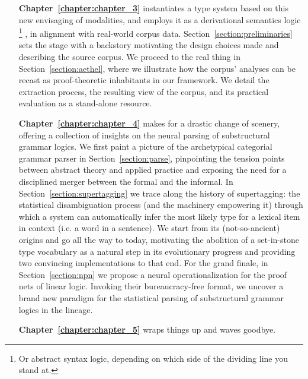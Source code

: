{\begin{enumerate}[labelindent=2pt, itemindent=30pt, labelsep=5pt, widest=Chapter III,align=right,itemsep=5pt]
Unsatisfied by the comparison, we move on to Section~\ref{section:modalities_for_dependency}, where we appropriate the modalities we resorted to earlier, repurposing them now as dependency domain demarcators.
\item[\textbf{Chapter~\ref{chapter:chapter_3}}] instantiates a type system based on this new envisaging of modalities, and employs it as a derivational semantics logic%
	\footnote{Or abstract syntax logic, depending on which side of the dividing line you stand at.}%
, in alignment with real-world corpus data. 
Section~\ref{section:preliminaries} sets the stage with a backstory motivating the design choices made and describing the source corpus.
We proceed to the real thing in Section~\ref{section:aethel}, where we illustrate how the corpus' analyses can be recast as proof-theoretic inhabitants in our framework.
We detail the extraction process, the resulting view of the corpus, and its practical evaluation as a stand-alone resource.
\item[\textbf{Chapter~\ref{chapter:chapter_4}}] makes for a drastic change of scenery, offering a collection of insights on the neural parsing of substructural grammar logics.
We first paint a picture of the archetypical categorial grammar parser in Section~\ref{section:parse}, pinpointing the tension points between abstract theory and applied practice and exposing the need for a disciplined merger between the formal and the informal.
In Section~\ref{section:supertagging} we trace along the history of supertagging: the statistical disambiguation process (and the machinery empowering it) through which a system can automatically infer the most likely type for a lexical item in context (i.e. a word in a sentence).
We start from its (not-so-ancient) origins and go all the way to today, motivating the abolition of a set-in-stone type vocabulary as a natural step in its evolutionary progress and providing two convincing implementations to that end.
For the grand finale, in Section~\ref{section:npn} we propose a neural operationalization for the proof nets of linear logic.
Invoking their bureaucracy-free format, we uncover a brand new paradigm for the statistical parsing of substructural grammar logics in the  lineage.
\item[\textbf{Chapter~\ref{chapter:chapter_5}}] wraps things up and waves  goodbye.
\end{enumerate}

\newpage
}
